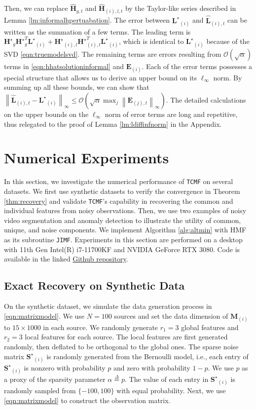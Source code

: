 \documentclass[twoside,11pt]{article}
\def\name{\texttt{TCMF}\xspace}
\def\inneralg{\texttt{JIMF}\xspace}
\newcommand{\mO}{\mathcal{O}}
\newcommand{\norm}[1]{\left\lVert#1\right\rVert}
\newcommand{\matE}{\mathbf{E}}
\newcommand{\hmatH}{{\hat{\mathbf{H}}}{}}
\newcommand{\matHst}{{\mathbf{H}^\star}}
\newcommand{\matLst}{{\mathbf{L}^\star}}
\newcommand{\matM}{\mathbf{M}}
\newcommand{\matSst}{{\mathbf{S}^\star}}
\newcommand{\hmatL}{\hat{\mathbf{L}}}
\begin{document}
Then, we can replace $\hmatH_{g,t}$ and $\hmatH_{(i),l,t}$ by the Taylor-like series described in Lemma \ref{lm:informalhpertuabation}. The error between $\matLst_{(i)}$ and $\hmatL_{(i),t}$ can be written as the summation of a few terms. The leading term is $\matHst_g\matHst_g^T\matLst_{(i)}+\matHst_{(i),l}\matHst_{(i),l}^T\matLst_{(i)}$, which is identical to $\matLst_{(i)}$ because of the SVD \eqref{eqn:truemodelsvd}. The remaining terms are errors resulting from $\mO(\sqrt{\alpha})$ terms in \eqref{eqn:hhatsolutioninformal} and $\matE_{(i)}$. Each of the error terms possesses a special structure that allows us to derive an upper bound on its $\ell_{\infty}$ norm. By summing up all these bounds, we can show that $\norm{\hmatL_{(i),t}-\matLst_{(i)}}_{\infty}\le \mO(\sqrt{\alpha}\max_j\norm{\matE_{(j),t}}_{\infty})$. The detailed calculations on the upper bounds on the $\ell_{\infty}$ norm of error terms are long and repetitive, thus relegated to the proof of Lemma \ref{lm:ldiffinfnorm} in the Appendix.


\section{Numerical Experiments}
\label{sec:numericalexperiment}
In this section, we investigate the numerical performance of \name on several datasets. We first use synthetic datasets to verify the convergence in Theorem \ref{thm:recovery} and validate \name's capability in recovering the common and individual features from noisy observations. Then, we use two examples of noisy video segmentation and anomaly detection to illustrate the utility of common, unique, and noise components. We implement Algorithm \ref{alg:altmin} with HMF \citep{hmf} as its subroutine \inneralg. Experiments in this section are performed on a desktop with 11th Gen Intel(R) i7-11700KF and NVIDIA GeForce RTX 3080. Code is available in the linked \href{https://github.com/UMDataScienceLab/TCMF}{Github repository}.

\subsection{Exact Recovery on Synthetic Data}
\label{sec:syntheticdata}
On the synthetic dataset, we simulate the data generation process in \eqref{eqn:matrixmodel}. We use $N=100$ sources and set the data dimension of $\matM_{(i)}$ to $15\times 1000$ in each source. We randomly generate $r_1=3$ global features and $r_2=3$ local features for each source. The local features are first generated randomly, then deflated to be orthogonal to the global ones. The sparse noise matrix $\matSst_{(i)}$ is randomly generated from the Bernoulli model, i.e., each entry of $\matSst_{(i)}$ is nonzero with probability $p$ and zero with probability $1-p$. We use $p$ as a proxy of the sparsity parameter $\alpha\overset{\Delta}{=}p$. The value of each entry in $\matSst_{(i)}$ is randomly sampled from $\{-100,100\}$ with equal probability. Next, we use \eqref{eqn:matrixmodel} to construct the observation matrix.  
\end{document}

